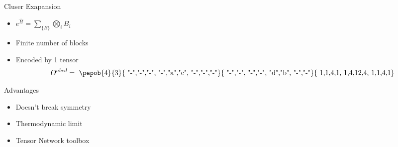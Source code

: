 \begin{frame}{Cluser Exapansion}
\begin{minipage}{0.49\textwidth}
{            \begin{itemize}
                \item   $e^{ \hat{H} } = \sum_{ \{B\} }  \bigotimes_i B_i $
                \item Finite number of blocks
                \item Encoded by 1 tensor
                      \begin{equation}
                          O^{abcd} = \vcenter{ \hbox{ \pepob{4}{3}{{
                                              "-","-","-",
                                              "-","a","c",
                                              "-","-","-"}}{{
                                              "-","-",
                                              "-","-",
                                              "d","b",
                                              "-","-"}}{{
                                              1,1,4,1,
                                              1,4,12,4,
                                              1,1,4,1}} }}
                      \end{equation}

            \end{itemize}

        }

         {
            \clustFullB
        }

    \end{minipage}
\end{frame}

\begin{frame}{Advantages}
    \begin{itemize}
        \item Doesn't break symmetry
        \item Thermodynamic limit
        \item Tensor Network toolbox
    \end{itemize}
\end{frame}

